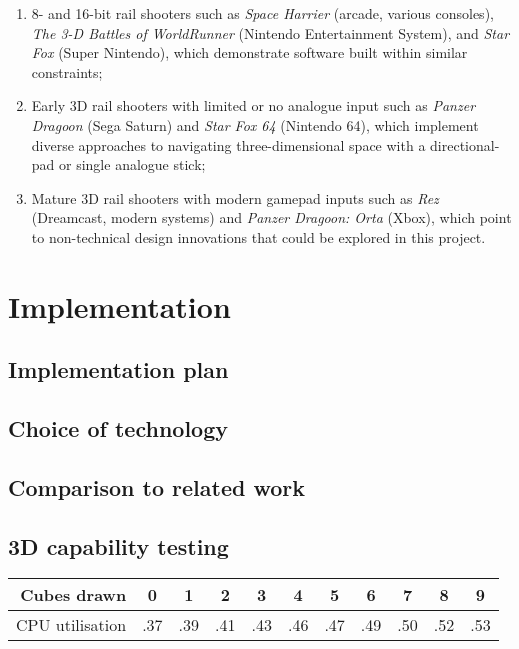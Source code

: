 \documentclass{article}
\begin{document}
\begin{enumerate}
    \item 8- and 16-bit rail shooters such as 
    \textit{Space Harrier} (arcade, various consoles),
    \textit{The 3-D Battles of WorldRunner} (Nintendo Entertainment System), and 
    \textit{Star Fox} (Super Nintendo),
    which demonstrate software built within similar constraints;
    
    \item Early 3D rail shooters with limited or no analogue input such as 
    \textit{Panzer Dragoon} (Sega Saturn) and
    \textit{Star Fox 64} (Nintendo 64),
    which implement diverse approaches to navigating three-dimensional space with a directional-pad or
    single analogue stick;
    
    \item Mature 3D rail shooters with modern gamepad inputs such as 
    \textit{Rez} (Dreamcast, modern systems) and
    \textit{Panzer Dragoon: Orta} (Xbox),
    which point to non-technical design innovations that could be explored in this project.
\end{enumerate}


\section{Implementation}
\subsection*{Implementation plan}

\subsection*{Choice of technology}
\subsection*{Comparison to related work}


\subsection*{3D capability testing}
\begin{center}
\begin{tabular}{r|c c c c c c c c c c}
     Cubes drawn & 0 & 1 & 2 & 3 & 4 & 5 & 6 & 7 & 8 & 9 \\
     \hline
     CPU utilisation & .37 & .39 & .41 & .43 & .46 & .47 & .49 & .50 & .52 & .53
\end{tabular}
\end{center}
\end{document}
